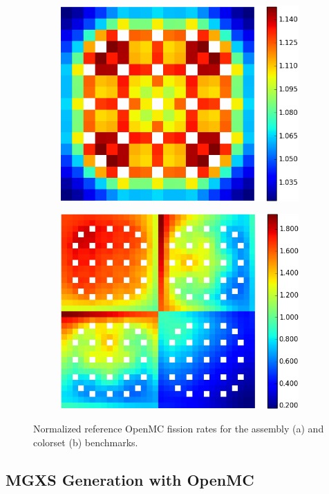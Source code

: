 \begin{figure}[h!]
\centering
\begin{subfigure}{0.45\textwidth}
  \centering
  \includegraphics[width=0.8\linewidth]{figures/assm_fiss_rates}
  \caption{}
  \label{fig:fiss-assm}
\end{subfigure}%
\begin{subfigure}{0.45\textwidth}
  \centering
  \includegraphics[width=0.8\linewidth]{figures/colorset_fiss_rates}
  \caption{}
  \label{fig:capt-assm}
\end{subfigure}
\caption{Normalized reference OpenMC fission rates for the assembly (a) and colorset (b) benchmarks.}
\label{fig:benchmarks-fiss-rates}
\end{figure}


\subsection{MGXS Generation with OpenMC}
\label{subsec:openmc}

